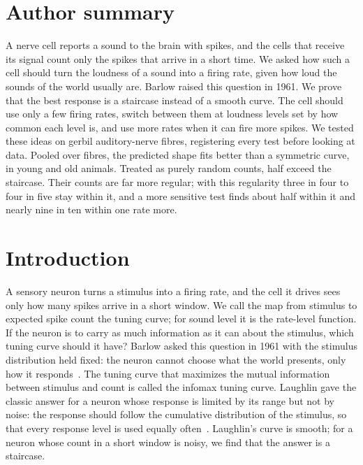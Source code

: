 \documentclass[10pt,letterpaper]{article}
\begin{document}
\section*{Author summary}
A nerve cell reports a sound to the brain with spikes, and the cells that receive its signal count only the spikes that arrive in a short time. We asked how such a cell should turn the loudness of a sound into a firing rate, given how loud the sounds of the world usually are. Barlow raised this question in 1961. We prove that the best response is a staircase instead of a smooth curve. The cell should use only a few firing rates, switch between them at loudness levels set by how common each level is, and use more rates when it can fire more spikes. We tested these ideas on gerbil auditory-nerve fibres, registering every test before looking at data. Pooled over fibres, the predicted shape fits better than a symmetric curve, in young and old animals. Treated as purely random counts, half exceed the staircase. Their counts are far more regular; with this regularity three in four to four in five stay within it, and a more sensitive test finds about half within it and nearly nine in ten within one rate more.



\clearpage
{}
\linenumbers

\section{Introduction}\label{sec:intro}

A sensory neuron turns a stimulus into a firing rate, and the cell it drives sees only how many spikes arrive in a short window. We call
the map from stimulus to expected spike count the tuning curve; for sound level it is the rate-level function. If the neuron is to
carry as much information as it can about the stimulus, which tuning curve should it have? Barlow asked this question in 1961 with the
stimulus distribution held fixed: the neuron cannot choose what the world presents, only how it responds~\cite{Barlow1961}. The tuning
curve that maximizes the mutual information between stimulus and count is called the infomax tuning curve. Laughlin gave the classic
answer for a neuron whose response is limited by its range but not by noise: the response should follow the cumulative distribution of
the stimulus, so that every response level is used equally often~\cite{Laughlin1981}. Laughlin's curve is smooth; for a neuron
whose count in a short window is noisy, we find that the answer is a staircase.
\end{document}
